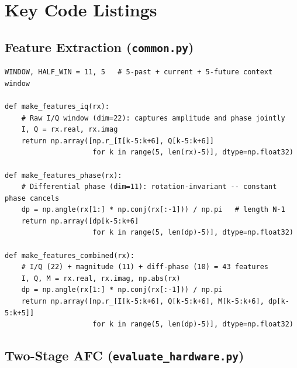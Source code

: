 \documentclass[journal]{IEEEtran}
\begin{document}
\section{Key Code Listings}
\label{app:code}

\subsection*{Feature Extraction (\texttt{common.py})}

\begin{lstlisting}[caption={Three windowed feature representations designed for
the ML equalisers.}, label={lst:features}]
WINDOW, HALF_WIN = 11, 5   # 5-past + current + 5-future context window

def make_features_iq(rx):
    # Raw I/Q window (dim=22): captures amplitude and phase jointly
    I, Q = rx.real, rx.imag
    return np.array([np.r_[I[k-5:k+6], Q[k-5:k+6]]
                     for k in range(5, len(rx)-5)], dtype=np.float32)

def make_features_phase(rx):
    # Differential phase (dim=11): rotation-invariant -- constant phase cancels
    dp = np.angle(rx[1:] * np.conj(rx[:-1])) / np.pi   # length N-1
    return np.array([dp[k-5:k+6]
                     for k in range(5, len(dp)-5)], dtype=np.float32)

def make_features_combined(rx):
    # I/Q (22) + magnitude (11) + diff-phase (10) = 43 features
    I, Q, M = rx.real, rx.imag, np.abs(rx)
    dp = np.angle(rx[1:] * np.conj(rx[:-1])) / np.pi
    return np.array([np.r_[I[k-5:k+6], Q[k-5:k+6], M[k-5:k+6], dp[k-5:k+5]]
                     for k in range(5, len(dp)-5)], dtype=np.float32)
\end{lstlisting}

\subsection*{Two-Stage AFC (\texttt{evaluate\_hardware.py})}
\end{document}
